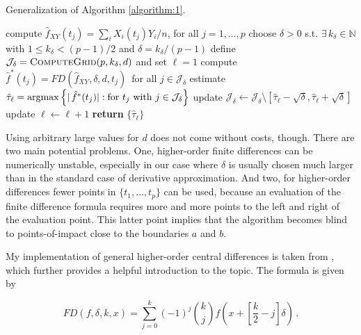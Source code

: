 \begin{tcolorbox}[standard jigsaw, opacityback=0]

\begin{algorithm}[H]
\caption{Generalization of Algorithm \ref{algorithm:1}.}
\label{algorithm:2}

\begin{algorithmic}[1]
  \State compute $\hat{f}_{XY}(t_j) = \sum_i X_i(t_j) Y_i / n$, for all $j=1,\dots,p$
  \State choose $\delta > 0$ s.t. $\exists \, k_{\delta} \in \mathbb{N}$ with $1 \leq
  k_{\delta} < (p - 1)/2$ and $\delta = k_{\delta} / (p-1)$
  \State define $\mathcal{J}_{\delta} = \Call{ComputeGrid}{p, k_{\delta}, d}$ and set
  $\ell = 1$
  \State compute $\hat{f}^\ast(t_j) = FD(\hat{f}_{XY}, \delta, d, t_j) \,$ for all
  $j \in \mathcal{J}_{\delta}$
  \State estimate $\hat{\tau}_{\ell} = \operatorname*{argmax} \left\{|\,\hat{f}^\ast(t_j)| : \text{for
    } t_j \text{ with } j \in \mathcal{J}_{\delta}\right\}$
    \State update $\mathcal{J}_{\delta} \leftarrow \mathcal{J}_{\delta} \setminus
    [\hat{\tau}_{\ell} - \sqrt{\delta}, \hat{\tau}_{\ell} + \sqrt{\delta}]$
    \State update $\ell \leftarrow \ell + 1$
  \EndWhile
  \State \textbf{return} $\{\hat{\tau}_{\ell}\}$
\end{algorithmic}
\end{algorithm}

\end{tcolorbox}

Using arbitrary large values for $d$ does not come without costs, though. There are two
main potential problems. One, higher-order finite differences can be numerically
unstable, especially in our case where $\delta$ is usually chosen much larger than in
the standard case of derivative approximation. And two, for higher-order differences
fewer points in $\{t_1, \dots, t_p\}$ can be used, because an evaluation of the finite
difference formula requires more and more points to the left and right of the evaluation
point. This latter point implies that the algorithm becomes blind to points-of-impact
close to the boundaries $a$ and $b$.

\smallskip

My implementation of general higher-order central differences is taken from
\cite{Jordan1965}, which further provides a helpful introduction to the topic. The
formula is given by

\[
    FD(f, \delta, k, x) = \sum_{j = 0}^k (-1)^j \binom{k}{j} f \left( x + \left[
    \frac{k}{2} - j \right] \delta \right) \,.
\]
